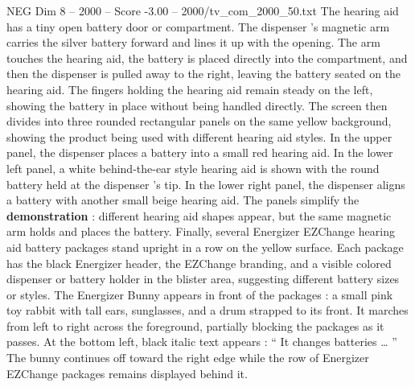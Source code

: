 \begin{textsample}{NEG Dim 8 – 2000 – Score -3.00 – 2000/tv\_com\_2000\_50.txt}
The hearing aid has a tiny open battery door or compartment.
The dispenser ’s magnetic arm carries the silver battery forward and lines it up with the opening.
The arm touches the hearing aid, the battery is placed directly into the compartment, and then the dispenser is pulled away to the right, leaving the battery seated on the hearing aid.
The fingers holding the hearing aid remain steady on the left, showing the battery in place without being handled directly.
The screen then divides into three rounded rectangular panels on the same yellow background, showing the product being used with different hearing aid styles.
In the upper panel, the dispenser places a battery into a small red hearing aid.
In the lower left panel, a white behind-the-ear style hearing aid is shown with the round battery held at the dispenser ’s tip.
In the lower right panel, the dispenser aligns a battery with another small beige hearing aid.
The panels simplify the \textbf{demonstration} : different hearing aid shapes appear, but the same magnetic arm holds and places the battery.
Finally, several Energizer EZChange hearing aid battery packages stand upright in a row on the yellow surface.
Each package has the black Energizer header, the EZChange branding, and a visible colored dispenser or battery holder in the blister area, suggesting different battery sizes or styles.
The Energizer Bunny appears in front of the packages : a small pink toy rabbit with tall ears, sunglasses, and a drum strapped to its front.
It marches from left to right across the foreground, partially blocking the packages as it passes.
At the bottom left, black italic text appears : “ It changes batteries … ” The bunny continues off toward the right edge while the row of Energizer EZChange packages remains displayed behind it.

\end{textsample}

